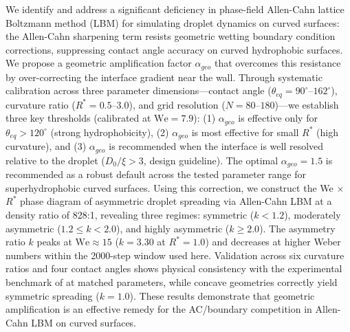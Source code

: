 We identify and address a significant deficiency in phase-field Allen-Cahn lattice Boltzmann method (LBM) for simulating droplet dynamics on curved surfaces: the Allen-Cahn sharpening term resists geometric wetting boundary condition corrections, suppressing contact angle accuracy on curved hydrophobic surfaces. We propose a geometric amplification factor $\alpha_{geo}$ that overcomes this resistance by over-correcting the interface gradient near the wall. Through systematic calibration across three parameter dimensions---contact angle ($\theta_{eq} = 90^\circ$--$162^\circ$), curvature ratio ($R^* = 0.5$--$3.0$), and grid resolution ($N = 80$--$180$)---we establish three key thresholds (calibrated at $\mathrm{We}=7.9$): (1) $\alpha_{geo}$ is effective only for $\theta_{eq} > 120^\circ$ (strong hydrophobicity), (2) $\alpha_{geo}$ is most effective for small $R^*$ (high curvature), and (3) $\alpha_{geo}$ is recommended when the interface is well resolved relative to the droplet ($D_0/\xi > 3$, design guideline). The optimal $\alpha_{geo} = 1.5$ is recommended as a robust default across the tested parameter range for superhydrophobic curved surfaces. Using this correction, we construct the We $\times$ $R^*$ phase diagram of asymmetric droplet spreading via Allen-Cahn LBM at a density ratio of 828:1, revealing three regimes: symmetric ($k < 1.2$), moderately asymmetric ($1.2 \leq k < 2.0$), and highly asymmetric ($k \geq 2.0$). The asymmetry ratio $k$ peaks at $\mathrm{We} \approx 15$ ($k = 3.30$ at $R^*=1.0$) and decreases at higher Weber numbers within the 2000-step window used here. Validation across six curvature ratios and four contact angles shows physical consistency with the experimental benchmark of \citet{liu2015symmetry} at matched parameters, while concave geometries correctly yield symmetric spreading ($k=1.0$). These results demonstrate that geometric amplification is an effective remedy for the AC/boundary competition in Allen-Cahn LBM on curved surfaces.
